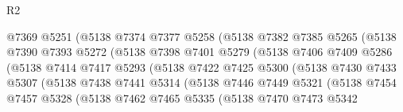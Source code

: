 \begin{lexlean}{R2}
\begin{coremodule}
                              @7369
                              @5251
                              (@5138
                                @7374
                                @7377
                                @5258
                                (@5138
                                  @7382
                                  @7385
                                  @5265
                                  (@5138
                                    @7390
                                    @7393
                                    @5272
                                    (@5138
                                      @7398
                                      @7401
                                      @5279
                                      (@5138
                                        @7406
                                        @7409
                                        @5286
                                        (@5138
                                          @7414
                                          @7417
                                          @5293
                                          (@5138
                                            @7422
                                            @7425
                                            @5300
                                            (@5138
                                              @7430
                                              @7433
                                              @5307
                                              (@5138
                                                @7438
                                                @7441
                                                @5314
                                                (@5138
                                                  @7446
                                                  @7449
                                                  @5321
                                                  (@5138
                                                    @7454
                                                    @7457
                                                    @5328
                                                    (@5138
                                                      @7462
                                                      @7465
                                                      @5335
                                                      (@5138
                                                        @7470
                                                        @7473
                                                        @5342

\end{coremodule}
\end{lexlean}
